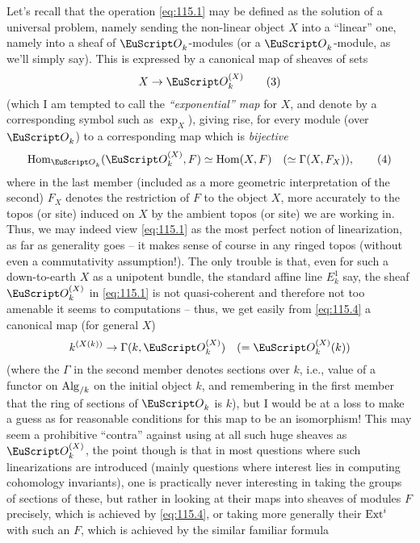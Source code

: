 Let's recall that the operation \eqref{eq:115.1} may be defined as the
solution of a universal problem, namely sending the non-linear object
$X$ into a ``linear'' one, namely into a sheaf of $\scrO_k$-modules
(or a $\scrO_k$-module, as we'll simply say). This is expressed by a
canonical map of sheaves of sets
\begin{equation}
  \label{eq:115.3}
  X \to \scrO_k^{(X)}\tag{3}
\end{equation}
(which I am tempted to call the \emph{``exponential'' map} for $X$,
and denote by a corresponding symbol such as $\exp_X$), giving rise,
for every module (over $\scrO_k$) to a corresponding map which is
\emph{bijective}
\begin{equation}
  \label{eq:115.4}
  \Hom_{\scrO_k}(\scrO_k^{(X)},F) \simeq
  \Hom(X,F)\quad(\simeq\Gamma(X,F_X)),\tag{4} 
\end{equation}
where in the last member (included as a more geometric interpretation
of the second) $F_X$ denotes the restriction of $F$ to the object $X$,
more accurately to the topos (or site) induced on $X$ by the ambient
topos (or site) we are working in. Thus, we may indeed view
\eqref{eq:115.1} as the most perfect notion of linearization, as far
as generality goes -- it makes sense of course in any ringed topos
(without even a commutativity assumption!). The only trouble is that,
even for such a down-to-earth $X$ as a unipotent bundle, the standard
affine line $E_k^1$ say, the sheaf $\scrO_k^{(X)}$ in \eqref{eq:115.1}
is not quasi-coherent and therefore not too amenable it seems to
computations -- thus, we get easily from \eqref{eq:115.4} a canonical
map (for general $X$)
\[k^{(X(k))} \to \Gamma(k,\scrO_k^{(X)}) \quad(=\scrO_k^{(X)}(k))\]
(where the $\Gamma$ in the second member denotes sections over $k$,
i.e., value of a functor on $\operatorname{Alg}_{/k}$ on the initial object $k$, and
remembering in the first member that the ring of sections of $\scrO_k$
is $k$), but I would be at a loss to make a guess as for reasonable
conditions for this map to be an isomorphism! This may seem a
prohibitive ``contra'' against using at all such huge sheaves as
$\scrO_k^{(X)}$, the point though is that in most questions where such
linearizations are introduced (mainly questions where interest lies in
computing cohomology invariants), one is practically never interesting
in taking the groups of sections of these, but rather in looking at
their maps into sheaves of modules $F$ precisely, which is achieved by
\eqref{eq:115.4}, or taking more generally their $\operatorname{Ext}^i$ with such an
$F$, which is achieved by the similar familiar formula
